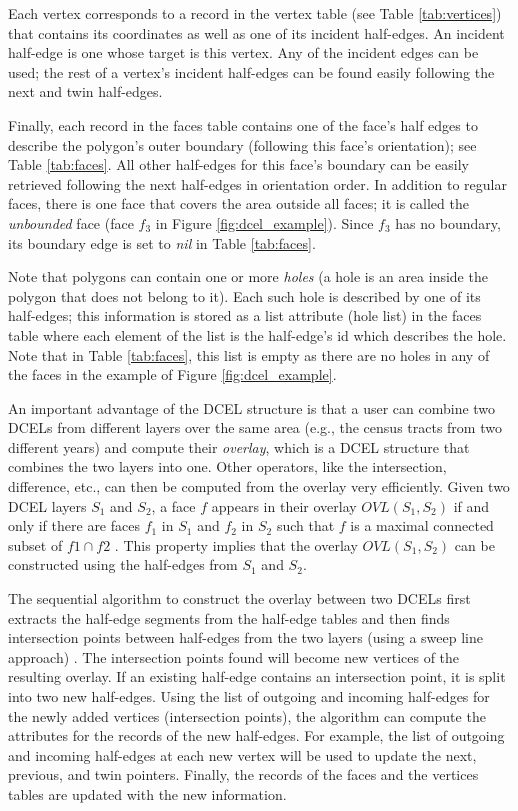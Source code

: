 Each vertex corresponds to a record in the vertex table (see Table \ref{tab:vertices}) that contains its coordinates as well as one of its incident half-edges. 
An incident half-edge is one whose target is this vertex. Any of the incident edges can be used; the rest of a vertex's incident half-edges can be found easily 
following the next and twin half-edges.

Finally, each record in the faces table contains one of the face's half edges to describe the polygon's outer boundary (following this face's orientation); see Table \ref{tab:faces}. All other half-edges for this face's boundary can be easily retrieved following the next half-edges in orientation order. In addition to regular faces, there is one face that covers the area outside all faces; it is called the  \textit{unbounded} face (face $f_3$ in Figure \ref{fig:dcel_example}). Since $f_3$ has no boundary, its boundary edge is set to \textit{nil} in Table \ref{tab:faces}.

Note that polygons can contain one or more \textit{holes} (a hole is an area inside the polygon that does not belong to it). Each such hole is described by one of its half-edges; this information is stored as a list attribute (hole list) in the faces table where each element of the list is the half-edge's id which describes the hole. Note that in Table \ref{tab:faces}, this list is empty as there are no holes in any of the faces in the example of Figure \ref{fig:dcel_example}. 

An important advantage of the DCEL structure is that a user can combine two DCELs from different layers over the same area (e.g., the census tracts from two different years) and compute their \textit{overlay}, which is a DCEL structure that combines the two layers into one. Other operators, like the intersection, difference, etc., can then be computed from the overlay very efficiently. Given two DCEL layers $S_1$ and $S_2$, a face $f$ appears in their overlay  $OVL(S_1, S_2)$ if and only if there are faces $f_1$ in $S_1$ and $f_2$ in $S_2$ such that $f$ is a maximal connected subset of $f1 \cap f2$ \cite{berg_computational_2008}. This property implies that the overlay $OVL(S_1, S_2)$ can be constructed using the half-edges from $S_1$ and $S_2$. 

The sequential algorithm \cite{fogel_cgal_2012} to construct the overlay between two DCELs first extracts the half-edge segments from the half-edge tables and then finds intersection points between half-edges from the two layers (using a sweep line approach) \cite{berg_computational_2008}. The intersection points found will become new vertices of the resulting overlay. If an existing half-edge contains an intersection point, it is split into two new half-edges. Using the list of outgoing and incoming half-edges for the newly added vertices (intersection points), the algorithm can compute the attributes for the records of the new half-edges. For example, the list of outgoing and incoming half-edges at each new vertex will be used to update the next, previous, and twin pointers. Finally, the records of the faces and the vertices tables are updated with the new information. 

